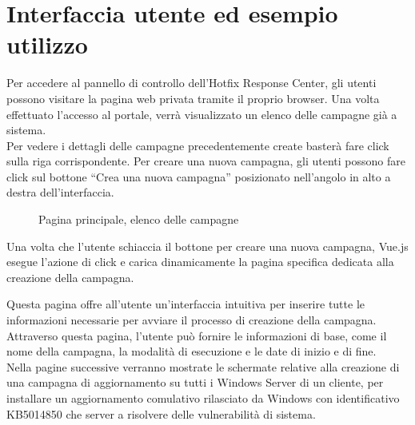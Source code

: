 \section{Interfaccia utente ed esempio utilizzo}
Per accedere al pannello di controllo dell’Hotfix Response Center, gli utenti 
possono visitare la pagina web privata tramite il proprio browser. 
Una volta effettuato l'accesso al portale, verrà visualizzato un elenco delle 
campagne già a sistema.\\

Per vedere i dettagli delle campagne precedentemente create basterà fare click 
sulla riga corrispondente. Per creare una nuova campagna, gli utenti 
possono fare click sul bottone “Crea una nuova campagna” posizionato nell'angolo 
in alto a destra dell’interfaccia.

\begin{figure}[H]
\begin{flushright}
    \centering
    \caption{Pagina principale, elenco delle campagne}
    \label{fig:Elenco delle campagne}
\end{flushright}
\end{figure}

Una volta che l'utente schiaccia il bottone per creare una nuova campagna, Vue.js 
esegue l'azione di click e carica dinamicamente la pagina specifica dedicata alla 
creazione della campagna. 

Questa pagina offre all'utente un'interfaccia intuitiva per inserire tutte 
le informazioni necessarie per avviare il processo di creazione 
della campagna. Attraverso questa pagina, l'utente può fornire le informazioni di base, 
come il nome della campagna, la modalità di esecuzione e le date di inizio e di 
fine.\\

Nella pagine successive verranno mostrate le schermate relative alla creazione di 
una campagna di aggiornamento su tutti i Windows Server di un cliente, per installare
un aggiornamento comulativo rilasciato da Windows con identificativo KB5014850 che
server a risolvere delle vulnerabilità di sistema.

